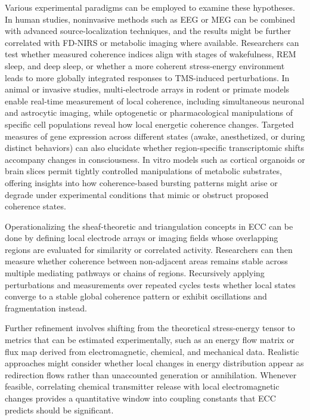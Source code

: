 Various experimental paradigms can be employed to examine these hypotheses. In human studies, noninvasive methods such as EEG or MEG can be combined with advanced source-localization techniques, and the results might be further correlated with FD-NIRS or metabolic imaging where available. Researchers can test whether measured coherence indices align with stages of wakefulness, REM sleep, and deep sleep, or whether a more coherent stress-energy environment leads to more globally integrated responses to TMS-induced perturbations. In animal or invasive studies, multi-electrode arrays in rodent or primate models enable real-time measurement of local coherence, including simultaneous neuronal and astrocytic imaging, while optogenetic or pharmacological manipulations of specific cell populations reveal how local energetic coherence changes. Targeted measures of gene expression across different states (awake, anesthetized, or during distinct behaviors) can also elucidate whether region-specific transcriptomic shifts accompany changes in consciousness. In vitro models such as cortical organoids or brain slices permit tightly controlled manipulations of metabolic substrates, offering insights into how coherence-based bursting patterns might arise or degrade under experimental conditions that mimic or obstruct proposed coherence states.

Operationalizing the sheaf-theoretic and triangulation concepts in ECC can be done by defining local electrode arrays or imaging fields whose overlapping regions are evaluated for similarity or correlated activity. Researchers can then measure whether coherence between non-adjacent areas remains stable across multiple mediating pathways or chains of regions. Recursively applying perturbations and measurements over repeated cycles tests whether local states converge to a stable global coherence pattern or exhibit oscillations and fragmentation instead.

Further refinement involves shifting from the theoretical stress-energy tensor to metrics that can be estimated experimentally, such as an energy flow matrix or flux map derived from electromagnetic, chemical, and mechanical data. Realistic approaches might consider whether local changes in energy distribution appear as redirection flows rather than unaccounted generation or annihilation. Whenever feasible, correlating chemical transmitter release with local electromagnetic changes provides a quantitative window into coupling constants that ECC predicts should be significant.


